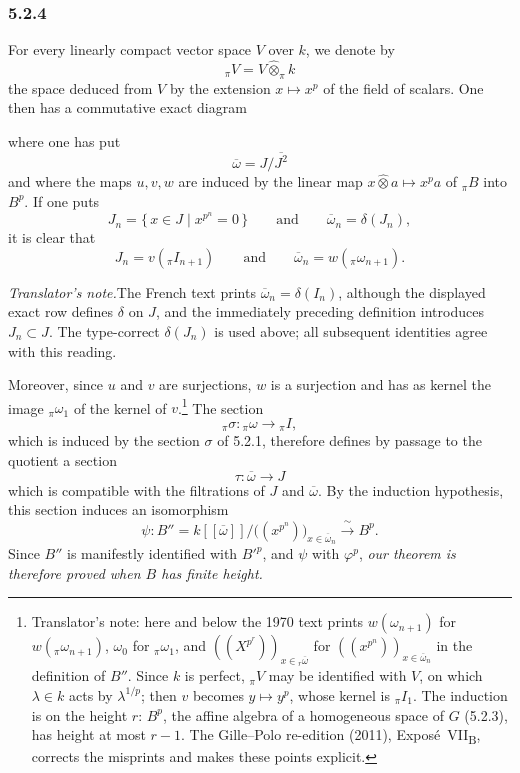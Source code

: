 
\subsubsection*{5.2.4}
\label{sga3:VIIB:5.2.4}

For every linearly compact vector space \(V\) over \(k\), we denote
by
\[
  {}_{\pi}V
  =
  V\widehat\otimes_{\pi}k
\]
the space deduced from \(V\) by the extension \(x\mapsto x^p\) of the
field of scalars. One then has a commutative exact diagram

\begin{figure}[H]
  \centering
  
\end{figure}

\noindent
where one has put
\[
  \overline\omega=J/\overline{J^2}
\]
and where the maps \(u,v,w\) are induced by the linear map
\(x\widehat\otimes a\mapsto x^pa\) of \({}_{\pi}B\) into \(B^p\). If one
puts
\[
  J_n=\{\,x\in J\mid x^{p^n}=0\,\}
  \qquad\text{and}\qquad
  \overline\omega_n=\delta(J_n),
\]
it is clear that
\[
  J_n=v({}_{\pi}I_{n+1})
  \qquad\text{and}\qquad
  \overline\omega_n=w({}_{\pi}\omega_{n+1}).
\]

\label{sga3:VIIB:5.2.4:delta-source-note}
\noindent\textit{Translator's note.}\enspace The French text prints
\(\overline\omega_n=\delta(I_n)\), although the displayed exact
row defines \(\delta\) on \(J\), and the immediately preceding
definition introduces \(J_n\subset J\). The type-correct
\(\delta(J_n)\) is used above; all subsequent identities agree
with this reading.

Moreover, since \(u\) and \(v\) are surjections, \(w\) is a surjection
and has as kernel the image \({}_{\pi}\omega_1\) of the kernel of \(v\).\footnote{Translator's
note: here and below the 1970 text prints \(w(\omega_{n+1})\) for \(w({}_{\pi}\omega_{n+1})\), \(\omega_0\)
for \({}_{\pi}\omega_1\), and \(((X^{p^r}))_{x\in{}_r\overline\omega}\) for
\(((x^{p^n}))_{x\in\overline\omega_n}\) in the definition of \(B''\). Since \(k\) is perfect, \({}_{\pi}V\) may
be identified with \(V\), on which \(\lambda\in k\) acts by \(\lambda^{1/p}\); then \(v\) becomes
\(y\mapsto y^p\), whose kernel is \({}_{\pi}I_1\). The induction is on the height \(r\): \(B^p\), the affine
algebra of a homogeneous space of \(G\) (5.2.3), has height at most \(r-1\). The Gille--Polo re-edition (2011),
Expos\'e~VII\textsubscript{B}, corrects the misprints and makes these points explicit.}
The section
\[
  {}_{\pi}\sigma:{}_{\pi}\omega\longrightarrow{}_{\pi}I,
\]
which is induced by the section \(\sigma\) of 5.2.1, therefore defines
by passage to the quotient a section
\[
  \tau:\overline\omega\longrightarrow J
\]
which is compatible with the filtrations of \(J\) and
\(\overline\omega\). By the induction hypothesis, this section induces
an isomorphism
\[
  \psi:
  B''
  =
  k[[\overline\omega]]
  \big/
  \bigl((x^{p^n})\bigr)_{x\in\overline\omega_n}
  \xrightarrow{\ \sim\ }
  B^p.
\]
Since \(B''\) is manifestly identified with \(B'^p\), and \(\psi\) with
\(\varphi^p\), \emph{our theorem is therefore proved when \(B\) has
finite height.}
